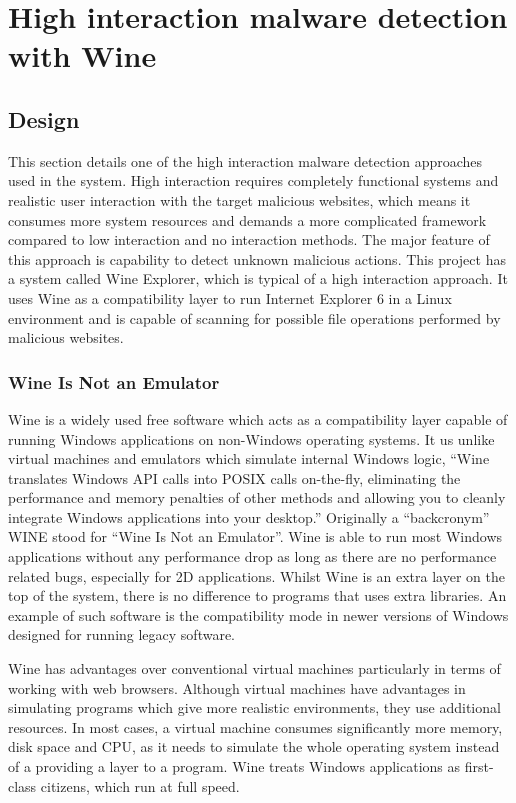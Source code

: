 \section{High interaction malware detection with Wine}
\subsection{Design}
This section details one of the high interaction malware detection 
approaches used in the system. High interaction requires completely functional systems 
and realistic user interaction with the target malicious websites, which means 
it consumes more system resources and demands a more complicated 
framework compared to low interaction and no interaction methods. The major 
feature of this approach is capability to detect unknown malicious 
actions. This project has a system called Wine Explorer, 
which is typical of a high interaction approach. It uses Wine as a compatibility layer to run 
Internet Explorer 6 in a Linux environment and is capable of scanning for 
possible file operations performed by malicious websites. 

\subsubsection{Wine Is Not an Emulator}
Wine is a widely used free software which acts as a compatibility layer 
capable of running Windows applications on non-Windows operating 
systems.\cite{wikiwine} It us unlike virtual machines and emulators which simulate 
internal Windows logic, ``Wine translates Windows API calls into POSIX calls 
on-the-fly, eliminating the performance and memory penalties of other methods 
and allowing you to cleanly integrate Windows applications into your 
desktop.''\cite{aboutwine} Originally a ``backcronym'' WINE stood for ``Wine Is Not an 
Emulator''. Wine is able to run most Windows applications 
without any performance drop as long as there are no performance related bugs, 
especially for 2D applications. Whilst Wine is an 
extra layer on the top of the system, there is no difference to programs that 
uses extra libraries. An example of such software is the compatibility 
mode in newer versions of Windows designed for running legacy 
software.\cite{wineperformance}

Wine has advantages over conventional virtual machines particularly in terms 
of working with web browsers. Although 
virtual machines have advantages in simulating programs which give more 
realistic environments, they use additional resources. In most cases, a virtual machine consumes significantly more memory, disk space and 
CPU, as it needs to simulate the whole operating system instead of a providing a layer to a program. Wine treats Windows applications as first-class 
citizens, which run at full speed.\cite{wineperformance}

